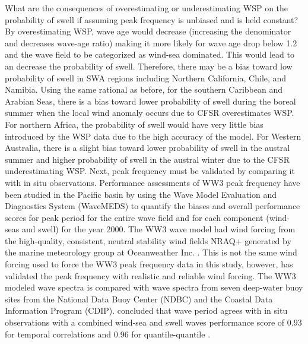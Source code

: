 \documentclass[12pt,twoside]{article}
\begin{document}
What are the consequences of overestimating or underestimating WSP on the probability of swell if assuming peak frequency is unbiased and is held constant? By overestimating WSP, wave age would decrease (increasing the denominator and decreases wave-age ratio) making it more likely for wave age drop below 1.2 and the wave field to be categorized as wind-sea dominated. This would lead to an decrease the probability of swell. Therefore, there may be a bias toward low probability of swell in SWA regions including Northern California, Chile, and Namibia. Using the same rational as before, for the southern Caribbean and Arabian Seas, there is a bias toward lower probability of swell during the boreal summer when the local wind anomaly occurs due to CFSR overestimates WSP. For northern Africa, the probability of swell would have very little bias introduced by the WSP data due to the high accuracy of the model. For Western Australia, there is a slight bias toward lower probability of swell in the austral summer and higher probability of swell in the austral winter due to the CFSR underestimating WSP. Next, peak frequency must be validated by comparing it with in situ observations. Performance assessments of WW3 peak frequency have been studied in the Pacific basin by \citet{hanson2009pacific} using the Wave Model Evaluation and Diagnostics System (WaveMEDS) to quantify the biases and overall performance scores for peak period for the entire wave field and for each component (wind-seas and swell) for the year 2000. The WW3 wave model had wind forcing from the high-quality, consistent, neutral stability wind fields NRAQ+ generated by the marine meteorology group at Oceanweather Inc. \cite{hanson2009pacific}. This is not the same wind forcing used to force the WW3 peak frequency data in this study, however, \citet{hanson2009pacific} has validated the peak frequency with realistic and reliable wind forcing. The WW3 modeled wave spectra is compared with wave spectra from seven deep-water buoy sites from the National Data Buoy Center (NDBC) and the Coastal Data Information Program (CDIP). \citet{hanson2009pacific} concluded that wave period agrees with in situ observations with a combined wind-sea and swell waves performance score of 0.93 for temporal correlations and 0.96 for quantile-quantile \cite{hanson2009pacific}. 

\end{document}

